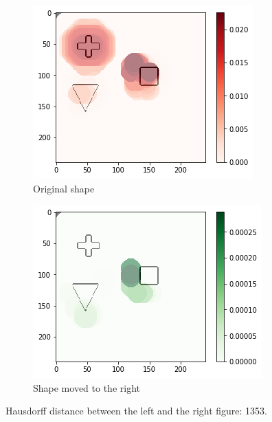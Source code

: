 \begin{figure}[H]
    \centering
    \begin{subfigure}{.5\textwidth}
        \centering
        \includegraphics[width=\linewidth]{chapters/06_hdm/visualization/hdm_worse.png}
        \caption{Original shape}
    \end{subfigure}%
    \begin{subfigure}{.5\textwidth}
        \centering
        \includegraphics[width=\linewidth]{chapters/06_hdm/visualization/hdm_better.png}
        \caption{Shape moved to the right}
    \end{subfigure}
    \caption{Hausdorff distance between the left and the right figure: 1353. }
    \label{hdm_visualization_better_w}
\end{figure}
